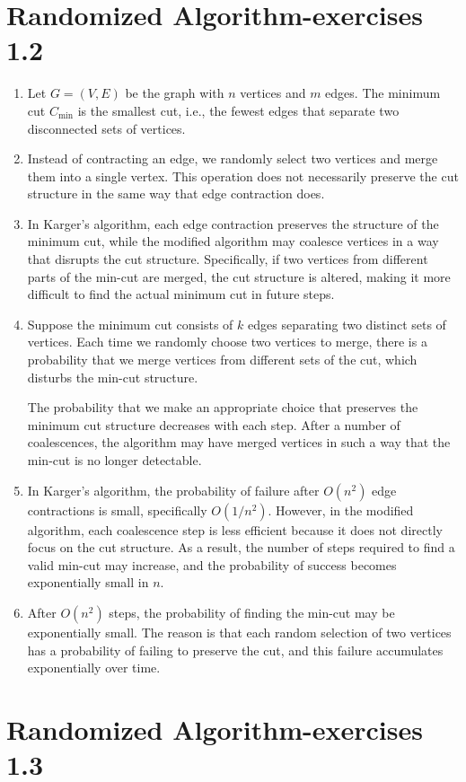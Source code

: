 \documentclass[12pt]{article}
\begin{document}
\section{Randomized Algorithm-exercises 1.2}
\begin{enumerate}
    \item Let \( G = (V, E) \) be the graph with \( n \) vertices and \( m \) edges. The minimum cut \( C_{\text{min}} \) is the smallest cut, i.e., the fewest edges that separate two disconnected sets of vertices.
    
    \item Instead of contracting an edge, we randomly select two vertices and merge them into a single vertex. This operation does not necessarily preserve the cut structure in the same way that edge contraction does.

    \item In Karger's algorithm, each edge contraction preserves the structure of the minimum cut, while the modified algorithm may coalesce vertices in a way that disrupts the cut structure. Specifically, if two vertices from different parts of the min-cut are merged, the cut structure is altered, making it more difficult to find the actual minimum cut in future steps.

    \item Suppose the minimum cut consists of \( k \) edges separating two distinct sets of vertices. Each time we randomly choose two vertices to merge, there is a probability that we merge vertices from different sets of the cut, which disturbs the min-cut structure.
    
    The probability that we make an appropriate choice that preserves the minimum cut structure decreases with each step. After a number of coalescences, the algorithm may have merged vertices in such a way that the min-cut is no longer detectable.

    \item In Karger's algorithm, the probability of failure after \( O(n^2) \) edge contractions is small, specifically \( O(1/n^2) \). However, in the modified algorithm, each coalescence step is less efficient because it does not directly focus on the cut structure. As a result, the number of steps required to find a valid min-cut may increase, and the probability of success becomes exponentially small in \( n \).

    \item After \( O(n^2) \) steps, the probability of finding the min-cut may be exponentially small. The reason is that each random selection of two vertices has a probability of failing to preserve the cut, and this failure accumulates exponentially over time.
\end{enumerate}



\section{Randomized Algorithm-exercises 1.3}
\end{document}
